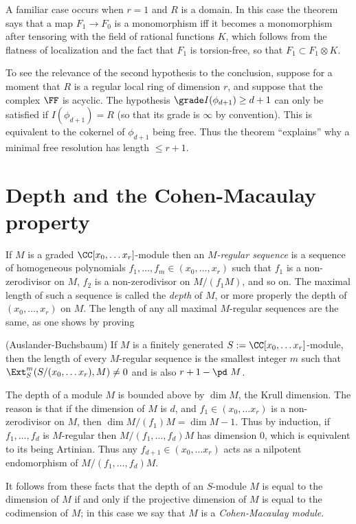 A familiar case occurs when  $r=1$ and $R$ is a domain. In this case the theorem says that a map $F_1\to F_0$ is a monomorphism iff it becomes a monomorphism after tensoring with the field of rational functions $K$, which follows from the flatness of
localization and the fact that $F_1$ is torsion-free, so that
$F_1 \subset F_1 \otimes K$. 

To see the relevance of the second hypothesis to the conclusion, suppose for a moment that $R$ is
a regular local ring of dimension $r$, and suppose that the complex $\FF$ is acyclic. The hypothesis $\grade I(\phi_{d+1}) \geq d+1$ can only be satisfied if $I(\phi_{d+1}) = R$ (so that its grade is $\infty$ by convention). This  is equivalent to the cokernel of $\phi_{d+1}$ being free. Thus the theorem ``explains'' why a minimal free resolution
has length $\leq r+1$.

\section{Depth and the Cohen-Macaulay property}

If $M$ is a graded  $\CC[x_0, \dots x_r]$-module then an \emph{$M$-regular sequence} is a sequence of homogeneous polynomials
$f_1,\dots,f_m \in (x_0,\dots, x_r)$ such that $f_1$ is a non-zerodivisor on $M$, $f_2$ is a non-zerodivisor on $M/(f_1M)$, and so on. 
The maximal length of such a sequence is called the \emph{depth} of $M$, or more properly the depth of $(x_0,\dots, x_r)$ on $M$.
The length of any all maximal $M$-regular sequences are the same, as one shows by proving

\begin{theorem} (Auslander-Buchsbaum)\label{Auslander-Buchsbaum}
If $M$ is a finitely generated $S := \CC[x_0, \dots x_r]$-module, then the length of every $M$-regular sequence is
the smallest integer $m$ such that $\Ext_S^m(S/(x_0, \dots x_r), M) \neq 0$ and is also $r+1 - \pd\  M$.
\end{theorem}
 
 The depth of a module $M$ is bounded above by $\dim M$, the Krull dimension. The reason is that if the dimension of $M$
 is $d$, and $f_1 \in (x_0, \dots x_r) $ is a non-zerodivisor on $M$, then $\dim M/(f_1)M= \dim M-1$. Thus by induction, if
  $f_1,\dots, f_d$ is $M$-regular then $M/(f_1, \dots, f_d)M$ has dimension 0, which is equivalent to its being Artinian. Thus any 
$ f_{d+1} \in(x_0, \dots x_r) $ acts as a nilpotent endomorphism of $M/(f_1, \dots, f_d)M$.

It follows from these facts that the depth of an $S$-module $M$ is equal to the dimension of $M$ if and only if the projective dimension
of $M$ is equal to the codimension of $M$; in this case we say that $M$ is a
\emph{Cohen-Macaulay module}. 

